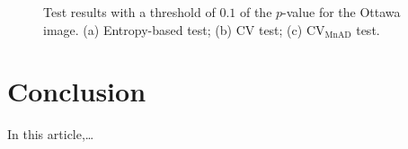 \documentclass[remotesensing,article,submit,moreauthors,pdftex]{Definitions/mdpi}
\begin{document}
\begin{figure}[H]

{\centering {}

}

\caption{Test results with a threshold of $0.1$ of the $p$-value for the Ottawa image. (a) Entropy-based test; (b) CV test; (c) $\text{CV}_{\text{MnAD}}$ test.}\label{fig:sim_SAR_Images_01_Ottawa}
\end{figure}

\hypertarget{sec:conclusion}{%
\section{Conclusion}\label{sec:conclusion}}

In this article,\ldots{}


\vspace{6pt}
\end{document}
